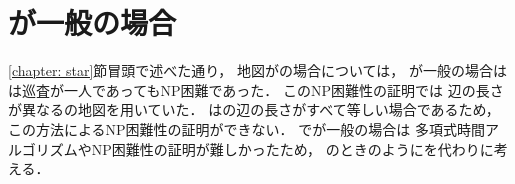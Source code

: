 \section{{\maxIdletime}が一般の場合}
\ref{chapter: star}節冒頭で述べた通り，
地図が{\graphStar}の場合については，
{\maxIdletime}が一般の場合は
{\patProb}は巡査が一人であってもNP困難であった\cite[Theorem~6]{coene2011charlemagne}．
このNP困難性の証明では
辺の長さが異なる{\graphStar}の地図を用いていた．
{\graphUnit}は{\graphStar}の辺の長さがすべて等しい場合であるため，
この方法によるNP困難性の証明ができない．
{\graphUnit}で{\maxIdletime}が一般の場合は
多項式時間アルゴリズムやNP困難性の証明が難しかったため，
{\graphLine}のときのように{\timeSpecifiedPatProb}を代わりに考える．





